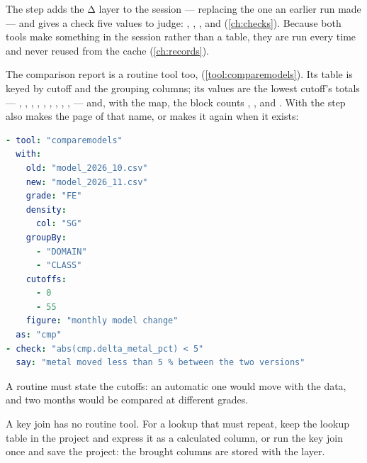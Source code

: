The step adds the Δ layer to the session — replacing the one an earlier run made — and gives a check five values to judge: , , ,  and  (\cref{ch:checks}). Because both tools make something in the session rather than a table, they are run every time and never reused from the cache (\cref{ch:records}).

The comparison report is a routine tool too,  (\cref{tool:comparemodels}). Its table is keyed by cutoff and the grouping columns; its values are the lowest cutoff's totals — , , , , , , , , ,  — and, with the map, the block counts , ,  and . With  the step also makes the page of that name, or makes it again when it exists:

\begin{lstlisting}[language=yaml]
- tool: "comparemodels"
  with:
    old: "model_2026_10.csv"
    new: "model_2026_11.csv"
    grade: "FE"
    density:
      col: "SG"
    groupBy:
      - "DOMAIN"
      - "CLASS"
    cutoffs:
      - 0
      - 55
    figure: "monthly model change"
  as: "cmp"
- check: "abs(cmp.delta_metal_pct) < 5"
  say: "metal moved less than 5 % between the two versions"
\end{lstlisting}

A routine must state the cutoffs: an automatic one would move with the data, and two months would be compared at different grades.

A key join has no routine tool. For a lookup that must repeat, keep the lookup table in the project and express it as a calculated column, or run the key join once and save the project: the brought columns are stored with the layer.
